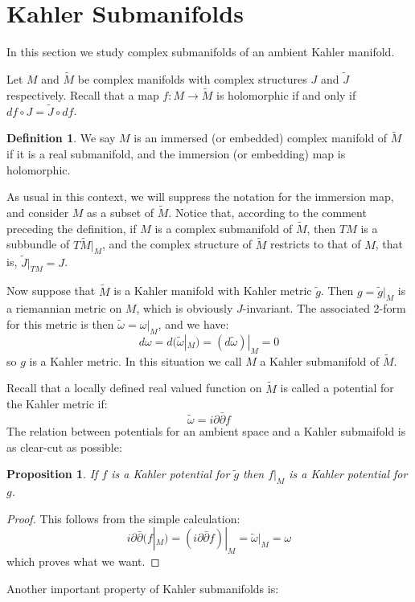 \documentclass[11pt]{amsart}
\newtheorem{prop}[subsection]{Proposition}
\theoremstyle{definition}
\newtheorem{definition}[subsection]{Definition}
\def \Mamb{ \mathcal{M} }
\def \del{ \partial }
\def \delbar{ \bar{\partial} }
\def \Mamb{ \tilde{M} }
\def \Jamb{ \tilde{J} }
\def \gamb{ \tilde{g} }
\def \omegaamb{ \tilde{\omega} }
\begin{document}
\section{ Kahler Submanifolds }

In this section we study complex submanifolds of an ambient Kahler manifold.

Let $M$ and $\Mamb$ be complex manifolds with complex structures $J$ and $\Jamb$ respectively.  Recall that a map $f:M \rightarrow \Mamb$ is holomorphic if and only if $df \circ J = \Jamb \circ df$.

\begin{definition} We say $M$ is an immersed (or embedded) complex manifold of $\Mamb$ if it is a real submanifold, and the immersion (or embedding) map is holomorphic.
\end{definition}

As usual in this context, we will suppress the notation for the immersion map, and consider $M$ as a subset of $\Mamb$.  Notice that, according to the comment preceding the definition, if $M$ is a complex submanifold of $\Mamb$, then $TM$ is a subbundle of $T \Mamb|_{M}$, and the complex structure of $\Mamb$ restricts to that of $M$, that is, $\Jamb |_{TM} = J$.

Now suppose that $\Mamb$ is a Kahler manifold with Kahler metric $\gamb$.  Then $g = \gamb |_{M}$ is a riemannian metric on $M$, which is obviously $J$-invariant.  The associated 2-form for this metric is then $ \omegaamb = \omega |_{M} $, and we have:
%
$$ d \omega = d ( \omegaamb |_{M} ) = ( d \omegaamb )|_{M} = 0 $$
%
so $g$ is a Kahler metric.  In this situation we call $M$ a Kahler submanifold of $\Mamb$.

Recall that a locally defined real valued function on $\Mamb$ is called a potential for the Kahler metric if:
%
$$ \omegaamb = i \del \delbar f $$
%
The relation between potentials for an ambient space and a Kahler submaifold is as clear-cut as possible:

\begin{prop} If $f$ is a Kahler potential for $\gamb$ then $f|_{M}$ is a Kahler potential for $g$.
\end{prop}

\begin{proof} This follows from the simple calculation:
%
$$ i \del \delbar ( f|_{M} ) = ( i \del \delbar f )|_{M} = \omegaamb |_{M} = \omega $$
%
which proves what we want.
\end{proof}

Another important property of Kahler submanifolds is:
\end{document}
